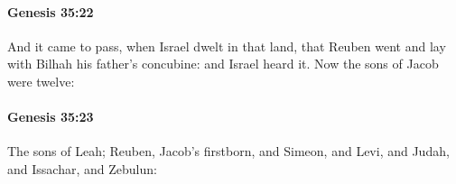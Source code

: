 		\paragraph{Genesis 35:22} %
			\label{GENESIS-35-22}

			And it came to pass, when Israel dwelt in that land, that Reuben went and lay with Bilhah his father's concubine: and Israel heard it. Now the sons of Jacob were twelve:


		\paragraph{Genesis 35:23} %
			\label{GENESIS-35-23}

			The sons of Leah; Reuben, Jacob's firstborn, and Simeon, and Levi, and Judah, and Issachar, and Zebulun:


